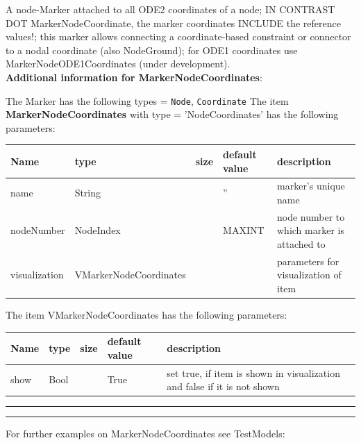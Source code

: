 \label{sec:item:MarkerNodeCoordinates}
A node-Marker attached to all ODE2 coordinates of a node; IN CONTRAST DOT MarkerNodeCoordinate, the marker coordinates INCLUDE the reference values!; this marker allows connecting a coordinate-based constraint or connector to a nodal coordinate (also NodeGround); for ODE1 coordinates use MarkerNodeODE1Coordinates (under development).\vspace{12pt}
 \\{\bf Additional information for MarkerNodeCoordinates}:
\bi
  \item The Marker has the following types = \texttt{Node}, \texttt{Coordinate}
\ei
\vspace{12pt} \noindent The item {\bf MarkerNodeCoordinates} with type = 'NodeCoordinates' has the following parameters:\vspace{-1cm}\\ 
\begin{center}
  \footnotesize
  \begin{longtable}{| p{4.5cm} | p{2.5cm} | p{0.5cm} | p{2.5cm} | p{6cm} |}
    \hline
    \bf Name & \bf type & \bf size & \bf default value & \bf description \\ \hline
    name &     String &      &     '' &     marker's unique name\\ \hline
    nodeNumber &     NodeIndex &      &     MAXINT &     node number to which marker is attached to\\ \hline
    visualization & VMarkerNodeCoordinates & & & parameters for visualization of item \\ \hline
	  \end{longtable}
	\end{center}
The item VMarkerNodeCoordinates has the following parameters:\vspace{-1cm}\\ 
\begin{center}
  \footnotesize
  \begin{longtable}{| p{4.5cm} | p{2.5cm} | p{0.5cm} | p{2.5cm} | p{6cm} |}
    \hline
    \bf Name & \bf type & \bf size & \bf default value & \bf description \\ \hline
    show &     Bool &      &     True &     set true, if item is shown in visualization and false if it is not shown\\ \hline
	  \end{longtable}
	\end{center}
\par\noindent\rule{\textwidth}{0.4pt}
\label{description_MarkerNodeCoordinates}
\vspace{6pt}\par\noindent\rule{\textwidth}{0.4pt}
%
\noindent For further examples on MarkerNodeCoordinates see TestModels:
\bi
\item{}\ei

